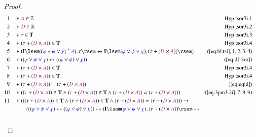 \begin{proof}
\begin{align}
  1 &&  & \vdash \mc{A} \in \mathbb{Z}&\text{Hyp~tsor3i.1}\notag%
  \\ 2 &&  & \vdash \mc{D} \in \mathbb{R}&\text{Hyp~tsor3i.2}\notag%
  \\ 3 &&  & \vdash \tau \in \mathbf{T}&\text{Hyp~tsor3i.3}\notag%
  \\ 4 &&  & \vdash ( \tau + ( \mc{D} \times \mc{A} ) ) \in
      \mathbf{T}&\text{Hyp~tsor3i.4}\notag%
  \\ 5 &&  & \vdash ( \mathbf{I} \lsem ( ( \mw{\varphi} \vee \mw{\psi} \vee
      \mw{\chi} ) ~\string^~ \mc{A} ) , \tau \rsem
      \leftrightarrow \mathbf{I} \lsem ( \mw{\varphi} \vee
      \mw{\psi} \vee \mw{\chi} ) , ( \tau + ( \mc{D} \times
      \mc{A} ) ) \rsem
      )&(\mbox{\ref{eq:bl.tsi}},1,2,3,4)\notag
  \\ 6 &&  & \vdash ( ( \mw{\varphi} \vee \mw{\psi} \vee \mw{\chi} )
      \leftrightarrow ( ( \mw{\varphi} \vee \mw{\psi} )
      \vee \mw{\chi} ) )&(\mbox{\ref{eq:df-3or}})\notag
  \\ 7 &&  & \vdash ( \tau + ( \mc{D} \times \mc{A} ) ) \in
      \mathbf{T}&\text{Hyp~tsor3i.4}\notag%
  \\ 8 &&  & \vdash ( \tau + ( \mc{D} \times \mc{A} ) ) \in
      \mathbf{T}&\text{Hyp~tsor3i.4}\notag%
  \\ 9 &&  & \vdash ( \tau + ( \mc{D} \times \mc{A} ) ) = ( \tau + ( \mc{D}
      \times \mc{A} ) )&(\mbox{\ref{eq:eqid}})\notag
  \\ 10 &&  & \vdash ( ( \tau + ( \mc{D} \times \mc{A} ) ) \in \mathbf{T} \wedge
      ( \tau + ( \mc{D} \times \mc{A} ) ) \in \mathbf{T}
      \wedge ( \tau + ( \mc{D} \times \mc{A} ) ) = ( \tau +
      ( \mc{D} \times \mc{A} ) )
      )&(\mbox{\ref{eq:3pm3.2i}},7,8,9)\notag
  \\ 11 &&  & \vdash ( ( ( \tau + ( \mc{D} \times \mc{A} ) ) \in \mathbf{T}
      \wedge ( \tau + ( \mc{D} \times \mc{A} ) ) \in
      \mathbf{T} \wedge ( \tau + ( \mc{D} \times \mc{A} ) )
      = ( \tau + ( \mc{D} \times \mc{A} ) ) ) \rightarrow  \notag \\ & & & \qquad
     (
      ( ( \mw{\varphi} \vee \mw{\psi} \vee \mw{\chi} )
      \leftrightarrow ( ( \mw{\varphi} \vee \mw{\psi} )
      \vee \mw{\chi} ) ) \leftrightarrow ( \mathbf{I} \lsem
      ( \mw{\varphi} \vee \mw{\psi} \vee \mw{\chi} ) , (
      \tau + ( \mc{D} \times \mc{A} ) ) \rsem
      \leftrightarrow  \notag \\ & & & \qquad

\end{align}
\end{proof}
